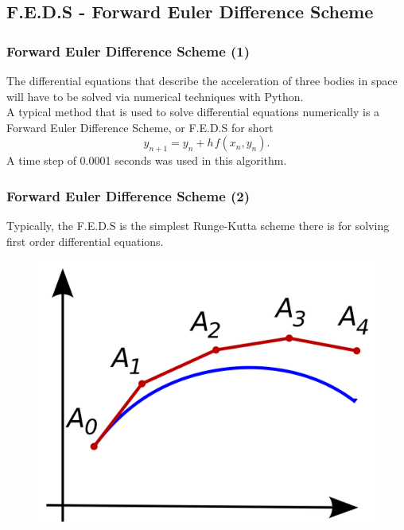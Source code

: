 \documentclass{beamer}
\begin{document}
\subsection{\tiny{F.E.D.S - Forward Euler Difference Scheme}}
\begin{frame}
\frametitle{Forward Euler Difference Scheme (1)}
The differential equations that describe the acceleration of three bodies in space will have to be solved via numerical techniques with Python.\\
\vspace{20pt}
A typical method that is used to solve differential equations numerically is a Forward Euler Difference Scheme, or F.E.D.S for short \cite{Forward Euler Difference Scheme}
\begin{equation}\label{2}
y_{n+1}=y_{n}+h\hspace{1pt}f(x_{n},y_{n}).
\end{equation}
A time step of 0.0001 seconds was used in this algorithm.
\end{frame}
\begin{frame}
\frametitle{Forward Euler Difference Scheme (2)}
Typically, the F.E.D.S is the simplest Runge-Kutta scheme there is for solving first order differential equations.
\begin{figure}[htbp]
\begin{center}
\includegraphics[width=0.50\linewidth]{EulerMethod.png}
\end{center}
\end{figure}
\end{frame}
\end{document}
